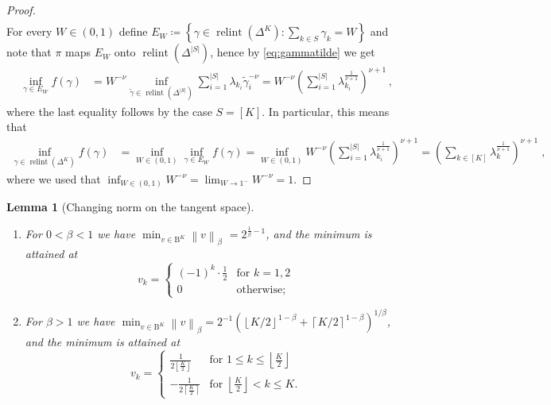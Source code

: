 \documentclass[11pt,oneside,a4paper]{article}
\newcommand{\lrb}[1]{\left(#1\right)}
\newcommand{\lcb}[1]{\left\{#1\right\}}
\newcommand{\lno}[1]{\left\lVert#1\right\rVert}
\newcommand{\fracc}[2]{#1/#2}
\theoremstyle{plain}
\newtheorem{lemma}[theorem]{Lemma}
\theoremstyle{definition}
\theoremstyle{remark}
\newcommand{\simplex}[1]{\Delta^{#1}}
\DeclareMathOperator*{\relint}{relint}
\newcommand{\tsphere}[1]{\mathrm{B}^{#1}}
\begin{document}
\begin{proof}
\begin{align}
\end{align}
For every $W  \in (0,1)$ define $E_W \coloneq \lcb{\gamma \in \relint\lrb{\simplex{K}}: \sum_{k \in S} \gamma_k= W }$ and note that $\pi$ maps $E_W$ onto $\relint\lrb{\simplex{|S|}}$, hence by \eqref{eq:gammatilde} we get
\begin{align*}
    \inf_{\gamma \in E_W} f(\gamma) 
&=
    W^{-\nu} \inf_{\tilde{\gamma} \in \relint\lrb{\simplex{|S|}}} \sum_{i = 1}^{|S|}  \lambda_{k_i} \tilde{\gamma}_i^{-\nu}
=
    W^{-\nu} \lrb{\sum_{i = 1}^{|S|} \lambda_{k_i}^{\frac{1}{\nu + 1}} }^{\nu + 1}\,,
\end{align*}
where the last equality follows by the case $S = [K]$. In particular, this means that 
\begin{align*}
    \inf_{\gamma \in \relint\lrb{\simplex{K}}} f(\gamma)
&=
    \inf_{W \in (0,1)}
    \inf_{\gamma \in E_W} f(\gamma) 
=
    \inf_{W \in (0,1)}
    W^{-\nu}
    \lrb{\sum_{i = 1}^{|S|} \lambda_{k_i}^{\frac{1}{\nu + 1} }}^{\nu + 1} 
=
     \lrb{\sum_{k \in [K]} \lambda_k^{\frac{1}{\nu + 1}} }^{\nu + 1}\;,
\end{align*}
where we used that 
$\inf_{W \in (0,1)} W^{-\nu}
=
    \lim_{W \to 1^-} W^{-\nu}
=
    1$.
\end{proof}
\begin{lemma}[Changing norm on the tangent space]\label{lemma:nuuuu}
\begin{enumerate}
    \item\label{i:nu-0-1}
        For $0 < \beta <1$ we have
        $
            \min_{v \in \tsphere{K}} \lno{v}_{\beta}
        $
        $
            =  2^{\frac{1}{\beta} - 1}
        $,
        and the minimum is attained at
        \begin{equation}\label{eq:disequalized}
            v_k
        =
            \begin{cases}
                (-1)^k \cdot \frac{1}{2}
                &\text{for }k = 1, 2
        \\
                0
                &\text{otherwise;}
            \end{cases}
        \end{equation}
    \item\label{i:nu-1-infty}
        For $\beta > 1$ we have
        $
            \min_{v \in \tsphere{K}} \lno{v}_{\beta}
        =  
             2^{-1} \lrb{{\left\lfloor \fracc{K}{2} \right\rfloor}^{1 - \beta} +  {\left\lceil \fracc{K}{2} \right\rceil}^{1 - \beta}}^{1/\beta}
       $,
        and the minimum is attained at
        \begin{equation}\label{eq:equalized}
            v_k
        =
            \begin{cases}
                \frac{1}{2{\left\lfloor \frac{K}{2} \right\rfloor}}
                &\text{for }1 \le k \le  \left\lfloor \frac{K}{2} \right\rfloor
        \\
                -\frac{1}{2{\left\lceil \frac{K}{2} \right\rceil}}
                &\text{for }  \left\lfloor \frac{K}{2} \right\rfloor < k \le K.
            \end{cases}
        \end{equation}
\end{enumerate}
\end{lemma}
\end{document}
